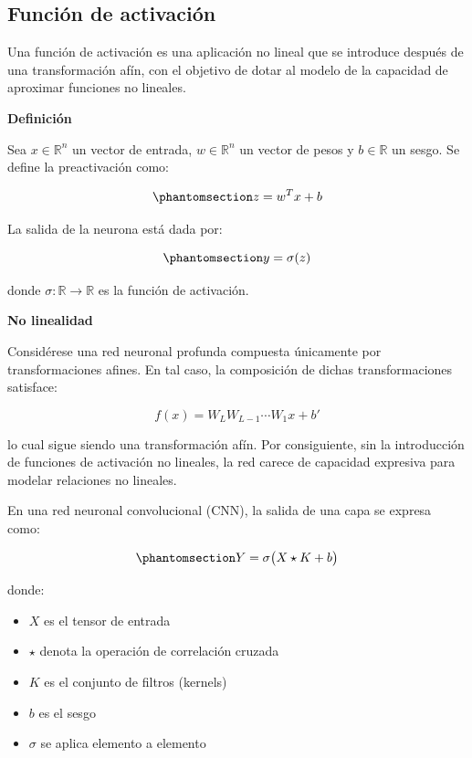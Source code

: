 \documentclass[
  spanish,
  us-letterpaper,
  DIV=11,
  numbers=noendperiod]{scrreprt}
\providecommand{\tightlist}{%
  \setlength{\itemsep}{0pt}\setlength{\parskip}{0pt}}
\begin{document}
\subsection{Función de activación}\label{funciuxf3n-de-activaciuxf3n}

Una función de activación es una aplicación no lineal que se introduce
después de una transformación afín, con el objetivo de dotar al modelo
de la capacidad de aproximar funciones no lineales.

\textbf{Definición}

Sea \(x \in \mathbb{R}^n\) un vector de entrada, \(w \in \mathbb{R}^n\)
un vector de pesos y \(b \in \mathbb{R}\) un sesgo. Se define la
preactivación como:

\begin{equation}\phantomsection\label{eq-preactivacion}{
z = w^T x + b
}\end{equation}

La salida de la neurona está dada por:

\begin{equation}\phantomsection\label{eq-activacion}{
y = \sigma(z)
}\end{equation}

donde \(\sigma : \mathbb{R} \to \mathbb{R}\) es la función de
activación.

\textbf{No linealidad}

Considérese una red neuronal profunda compuesta únicamente por
transformaciones afines. En tal caso, la composición de dichas
transformaciones satisface:

\[
f(x) = W_L W_{L-1} \cdots W_1 x + b'
\]

lo cual sigue siendo una transformación afín. Por consiguiente, sin la
introducción de funciones de activación no lineales, la red carece de
capacidad expresiva para modelar relaciones no lineales.

En una red neuronal convolucional (CNN), la salida de una capa se
expresa como:

\begin{equation}\phantomsection\label{eq-cnn-activacion}{
Y = \sigma\big( X \star K + b \big)
}\end{equation}

donde:

\begin{itemize}
\tightlist
\item
  \(X\) es el tensor de entrada\\
\item
  \(\star\) denota la operación de correlación cruzada\\
\item
  \(K\) es el conjunto de filtros (kernels)\\
\item
  \(b\) es el sesgo\\
\item
  \(\sigma\) se aplica elemento a elemento
\end{itemize}
\end{document}
